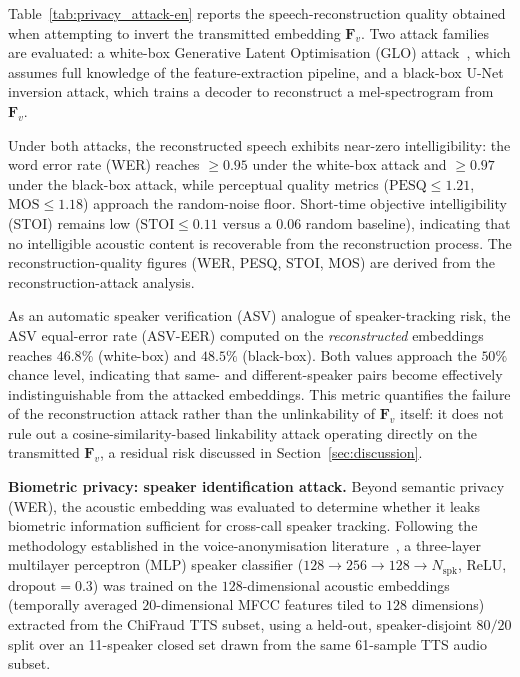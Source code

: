 \documentclass[a4paper,fleqn]{cas-sc}
\begin{document}
Table~\ref{tab:privacy_attack-en} reports the speech-reconstruction quality obtained when attempting to invert the transmitted embedding $\bm{F}_v$. Two attack families are evaluated: a white-box Generative Latent Optimisation (GLO) attack~\citep{23}, which assumes full knowledge of the feature-extraction pipeline, and a black-box U-Net inversion attack, which trains a decoder to reconstruct a mel-spectrogram from $\bm{F}_v$.

Under both attacks, the reconstructed speech exhibits near-zero intelligibility: the word error rate (WER) reaches $\ge 0.95$ under the white-box attack and $\ge 0.97$ under the black-box attack, while perceptual quality metrics ($\mathrm{PESQ} \le 1.21$, $\mathrm{MOS} \le 1.18$) approach the random-noise floor. Short-time objective intelligibility (STOI) remains low ($\mathrm{STOI} \le 0.11$ versus a $0.06$ random baseline), indicating that no intelligible acoustic content is recoverable from the reconstruction process. The reconstruction-quality figures (WER, PESQ, STOI, MOS) are derived from the reconstruction-attack analysis.

As an automatic speaker verification (ASV) analogue of speaker-tracking risk, the ASV equal-error rate (ASV-EER) computed on the \textit{reconstructed} embeddings reaches $46.8\%$ (white-box) and $48.5\%$ (black-box). Both values approach the $50\%$ chance level, indicating that same- and different-speaker pairs become effectively indistinguishable from the attacked embeddings. This metric quantifies the failure of the reconstruction attack rather than the unlinkability of $\bm{F}_v$ itself: it does not rule out a cosine-similarity-based linkability attack operating directly on the transmitted $\bm{F}_v$, a residual risk discussed in Section~\ref{sec:discussion}.

\medskip
\noindent\textbf{Biometric privacy: speaker identification attack.}
Beyond semantic privacy (WER), the acoustic embedding was evaluated to determine whether it leaks biometric information sufficient for cross-call speaker tracking. Following the methodology established in the voice-anonymisation literature~\citep{22}, a three-layer multilayer perceptron (MLP) speaker classifier ($128 \to 256 \to 128 \to N_{\text{spk}}$, ReLU, $\text{dropout}=0.3$) was trained on the $128$-dimensional acoustic embeddings (temporally averaged $20$-dimensional MFCC features tiled to $128$ dimensions) extracted from the ChiFraud TTS subset, using a held-out, speaker-disjoint $80/20$ split over an 11-speaker closed set drawn from the same 61-sample TTS audio subset.
\end{document}
